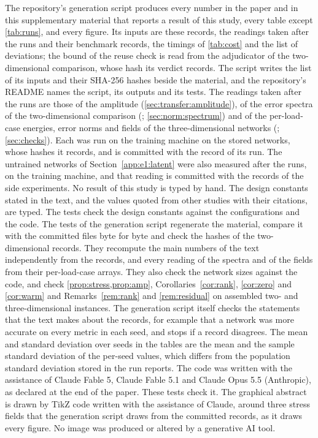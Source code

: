 The repository's generation script produces every number in the paper and in this
supplementary material that reports a result of this study, every table except
\cref{tab:runs}, and every figure. Its inputs are these
records, the readings taken after the runs and their benchmark records, the timings of
\cref{tab:cost} and the list of deviations; the bound of the reuse check is read from the
adjudicator of the two-dimensional comparison, whose hash its verdict records. The script
writes the list of
its inputs and their SHA-256 hashes beside the material, and the repository's README names
the script, its outputs and its tests. The readings taken after the runs are those of the
amplitude (\cref{sec:transfer:amplitude}), of the error spectra of the two-dimensional
comparison (; \cref{sec:norm:spectrum}) and of the
per-load-case energies, error norms and fields of the three-dimensional networks
(; \cref{sec:checks}). Each was run on the training machine on the stored networks, whose hashes it records, and is committed with the record of
its run. The untrained networks of Section~\ref{app:e1:latent} were also measured after the runs, on the training machine, and that reading is committed with the records of the side
experiments. No result of this study is typed by hand. The design constants stated in the text,
and the values quoted from other studies with their citations, are typed. The tests check the
design constants against the configurations and the code. The tests of the generation
script regenerate the material, compare it with the committed files byte for byte and check
the hashes of the two-dimensional records. They recompute the main numbers of the text
independently from the records, and every reading of the spectra and of the fields from
their per-load-case arrays. They also check the network sizes against the code, and check
\cref{prop:stress,prop:amp}, Corollaries~\ref{cor:rank}, \ref{cor:zero} and
\ref{cor:warm} and Remarks~\ref{rem:rank} and \ref{rem:residual} on assembled two- and three-dimensional instances. The
generation script itself checks the statements that the text makes about the records, for
example that a network was more accurate on every metric in each seed, and stops if a record
disagrees. The mean and standard deviation over seeds in the tables are the mean and the
sample standard deviation of the per-seed values, which differs from the population standard
deviation stored in the run reports. The code was written with the assistance of Claude
Fable 5, Claude Fable 5.1 and Claude Opus 5.5 (Anthropic), as declared at the end of the paper. These tests check it. The graphical abstract is drawn by TikZ code
written with the assistance of Claude, around three stress fields that the generation
script draws from the committed records, as it draws every figure. No image was produced
or altered by a generative AI tool.

